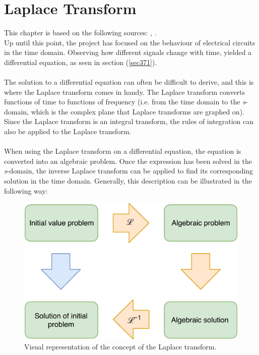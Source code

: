 \chapter{Laplace Transform}
This chapter is based on the following sources: \cite{calc}, \cite{diffandcomplex}. \\
Up until this point, the project has focused on the behaviour of electrical circuits in the time domain. Observing how different signals change with time, yielded a differential equation, as seen in section (\ref{sec371}).
\\ \\
The solution to a differential equation can often be difficult to derive, and this is where the Laplace transform comes in handy. The Laplace transform converts functions of time to functions of frequency (i.e. from the time domain to the \textit{s}-domain, which is the complex plane that Laplace transforms are graphed on). Since the Laplace transform is an integral transform, the rules of integration can also be applied to the Laplace transform.
\\ \\
\noindent When using the Laplace transform on a differential equation, the equation is converted into an algebraic problem. Once the expression has been solved in the \textit{s}-domain, the inverse Laplace transform can be applied to find its corresponding solution in the time domain. Generally, this description can be illustrated in the following way:
\begin{figure}[H]
\center
\includegraphics[scale=1]{fig/img/laplace_circ.pdf}
\caption{Visual representation of the concept of the Laplace transform.}
\label{lpsol}
\end{figure}

